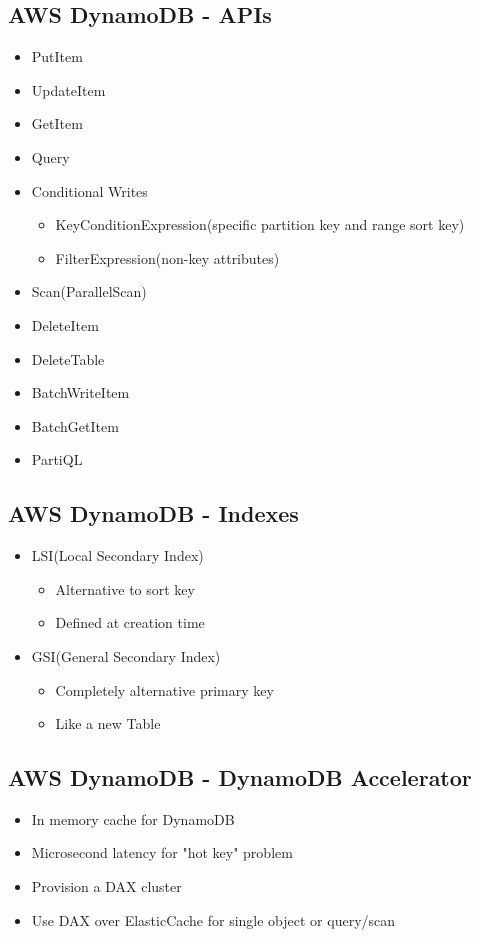 \documentclass[../../main.tex]{subfiles}
\begin{document}
\subsection{AWS DynamoDB - APIs}
\begin{itemize}
    \item PutItem
    \item UpdateItem
    \item GetItem
    \item Query
    \item Conditional Writes
    \begin{itemize}
        \item KeyConditionExpression(specific partition key and range sort key)
        \item FilterExpression(non-key attributes)
    \end{itemize}
    \item Scan(ParallelScan)
    \item DeleteItem
    \item DeleteTable
    \item BatchWriteItem
    \item BatchGetItem
    \item PartiQL
\end{itemize}

\subsection{AWS DynamoDB - Indexes}
\begin{itemize}
    \item LSI(Local Secondary Index)
    \begin{itemize}
        \item Alternative to sort key
        \item Defined at creation time
    \end{itemize}
    \item GSI(General Secondary Index)
    \begin{itemize}
        \item Completely alternative primary key
        \item Like a new Table
    \end{itemize}
\end{itemize}

\subsection{AWS DynamoDB - DynamoDB Accelerator}
\begin{itemize}
    \item In memory cache for DynamoDB
    \item Microsecond latency for "hot key" problem
    \item Provision a DAX cluster
    \item Use DAX over ElasticCache for single object or query/scan
\end{itemize}
\end{document}
